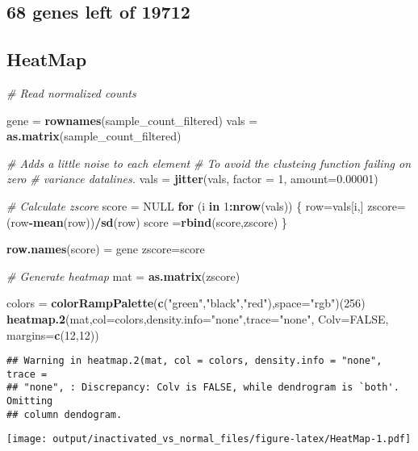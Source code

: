 \documentclass[]{article}
\newenvironment{Shaded}{\begin{snugshade}}{\end{snugshade}}
\newcommand{\KeywordTok}[1]{\textcolor[rgb]{0.13,0.29,0.53}{\textbf{#1}}}
\newcommand{\DataTypeTok}[1]{\textcolor[rgb]{0.13,0.29,0.53}{#1}}
\newcommand{\DecValTok}[1]{\textcolor[rgb]{0.00,0.00,0.81}{#1}}
\newcommand{\FloatTok}[1]{\textcolor[rgb]{0.00,0.00,0.81}{#1}}
\newcommand{\StringTok}[1]{\textcolor[rgb]{0.31,0.60,0.02}{#1}}
\newcommand{\CommentTok}[1]{\textcolor[rgb]{0.56,0.35,0.01}{\textit{#1}}}
\newcommand{\OtherTok}[1]{\textcolor[rgb]{0.56,0.35,0.01}{#1}}
\newcommand{\ControlFlowTok}[1]{\textcolor[rgb]{0.13,0.29,0.53}{\textbf{#1}}}
\newcommand{\OperatorTok}[1]{\textcolor[rgb]{0.81,0.36,0.00}{\textbf{#1}}}
\newcommand{\NormalTok}[1]{#1}
\begin{document}
\subsection{68 genes left of 19712}\label{genes-left-of-19712}

\subsection{HeatMap}\label{heatmap}

\begin{Shaded}
\begin{Highlighting}[]
\CommentTok{# Read normalized counts}

\NormalTok{gene =}\StringTok{ }\KeywordTok{rownames}\NormalTok{(sample_count_filtered)}
\NormalTok{vals =}\StringTok{ }\KeywordTok{as.matrix}\NormalTok{(sample_count_filtered)}

\CommentTok{# Adds a little noise to each element}
\CommentTok{# To avoid the clusteing function failing on zero}
\CommentTok{# variance datalines.}
\NormalTok{vals =}\StringTok{ }\KeywordTok{jitter}\NormalTok{(vals, }\DataTypeTok{factor =} \DecValTok{1}\NormalTok{, }\DataTypeTok{amount=}\FloatTok{0.00001}\NormalTok{)}


\CommentTok{# Calculate zscore}
\NormalTok{score =}\StringTok{ }\OtherTok{NULL}
\ControlFlowTok{for}\NormalTok{ (i }\ControlFlowTok{in} \DecValTok{1}\OperatorTok{:}\KeywordTok{nrow}\NormalTok{(vals)) \{}
\NormalTok{    row=vals[i,]}
\NormalTok{    zscore=(row}\OperatorTok{-}\KeywordTok{mean}\NormalTok{(row))}\OperatorTok{/}\KeywordTok{sd}\NormalTok{(row)}
\NormalTok{    score =}\KeywordTok{rbind}\NormalTok{(score,zscore)}
\NormalTok{\}}

\KeywordTok{row.names}\NormalTok{(score) =}\StringTok{ }\NormalTok{gene}
\NormalTok{zscore=score}

\CommentTok{# Generate heatmap}
\NormalTok{mat =}\StringTok{ }\KeywordTok{as.matrix}\NormalTok{(zscore)}

\NormalTok{colors =}\StringTok{ }\KeywordTok{colorRampPalette}\NormalTok{(}\KeywordTok{c}\NormalTok{(}\StringTok{"green"}\NormalTok{,}\StringTok{"black"}\NormalTok{,}\StringTok{"red"}\NormalTok{),}\DataTypeTok{space=}\StringTok{"rgb"}\NormalTok{)(}\DecValTok{256}\NormalTok{)}
\KeywordTok{heatmap.2}\NormalTok{(mat,}\DataTypeTok{col=}\NormalTok{colors,}\DataTypeTok{density.info=}\StringTok{"none"}\NormalTok{,}\DataTypeTok{trace=}\StringTok{"none"}\NormalTok{, }\DataTypeTok{Colv=}\OtherTok{FALSE}\NormalTok{, }\DataTypeTok{margins=}\KeywordTok{c}\NormalTok{(}\DecValTok{12}\NormalTok{,}\DecValTok{12}\NormalTok{))}
\end{Highlighting}
\end{Shaded}

\begin{verbatim}
## Warning in heatmap.2(mat, col = colors, density.info = "none", trace =
## "none", : Discrepancy: Colv is FALSE, while dendrogram is `both'. Omitting
## column dendogram.
\end{verbatim}

\texttt{[image: output/inactivated\_vs\_normal\_files/figure-latex/HeatMap-1.pdf]}
\end{document}
